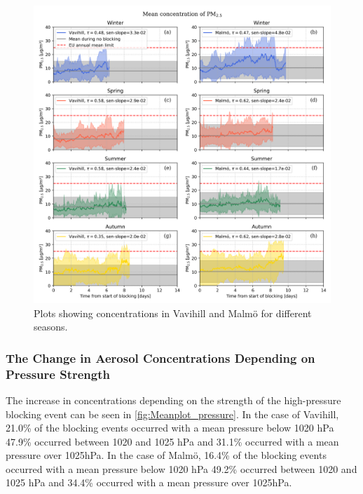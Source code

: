 \begin{figure}[H]
    \centering
    \includegraphics[width=\textwidth]{Figures/Meanplot_seasonal.png}
    \caption{Plots showing \PM concentrations in Vavihill and Malmö for different seasons. }
    \label{fig:Meanplot_seasonal}
\end{figure}
 

\subsubsection{The Change in Aerosol Concentrations Depending on Pressure Strength}
The increase in \PM  concentrations depending on the strength of the high-pressure blocking event can be seen in \autoref{fig:Meanplot_pressure}. In the case of Vavihill, 21.0\% of the blocking events occurred with a mean pressure below 1020 hPa 47.9\% occurred between 1020 and 1025 hPa and 31.1\% occurred with a mean pressure over 1025hPa. In the case of Malmö, 16.4\% of the blocking events occurred with a mean pressure below 1020 hPa 49.2\% occurred between 1020 and 1025 hPa and 34.4\% occurred with a mean pressure over 1025hPa.


